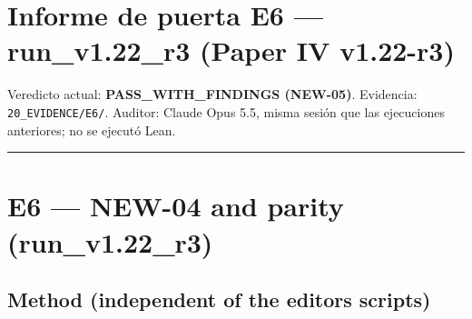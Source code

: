 \documentclass[
]{article}
\author{}
\date{}
\begin{document}
\section{Informe de puerta E6 --- run\_v1.22\_r3 (Paper IV
v1.22-r3)}\label{informe-de-puerta-e6--run_v122_r3-paper-iv-v122-r3}

Veredicto actual: \textbf{PASS\_WITH\_FINDINGS (NEW-05)}. Evidencia:
\texttt{20\_EVIDENCE/E6/}. Auditor: Claude Opus 5.5, misma sesión que
las ejecuciones anteriores; no se ejecutó Lean.

\begin{center}\rule{0.5\linewidth}{0.5pt}\end{center}

\section{E6 --- NEW-04 and parity
(run\_v1.22\_r3)}\label{e6--new-04-and-parity-run_v122_r3}

\subsection{Method (independent of the editor\textquotesingle s
scripts)}\label{method-independent-of-the-editors-scripts}
\end{document}
